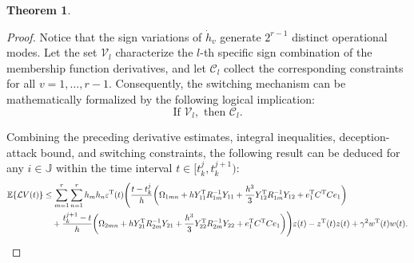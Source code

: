 \documentclass[preprint,review,fleqn,sort&compress,3p]{elsarticle}
\theoremstyle{definition} %
\theoremstyle{definition}%
\newtheorem{thm}{Theorem}[section]
\begin{document}
\begin{thm}
\begin{proof}
			Notice that the sign variations of $\dot{h}_v$ generate $2^{r-1}$ distinct operational modes. Let the set $\mathcal{V}_l$ characterize the $l$-th specific sign combination of the membership function derivatives, and let $\mathcal{C}_l$ collect the corresponding constraints for all $v=1,\ldots,r-1$. Consequently, the switching mechanism can be mathematically formalized by the following logical implication:
			\begin{equation}
				\text{If } \mathcal{V}_l, \text{ then } \mathcal{C}_l. \label{eq_if_then_2}
			\end{equation}
			
			Combining the preceding derivative estimates, integral inequalities, deception-attack bound, and switching constraints, the following result can be deduced for any $i \in \mathbb{J}$ within the time interval $t \in [t_k^j, t_k^{j+1})$:
			\begin{align}
				\mathbb{E}\{\mathcal{L}V(t)\}
				&\leq
				\sum_{m=1}^{r} \sum_{n=1}^{r} h_m h_n \varepsilon^\mathrm{T}(t) \Bigg( 
				\frac{t - t_k^j}{h} \bigg( 
				\Omega_{1mn} 
				+ h  Y_{11}^{\mathrm{T}} R_{1m}^{-1} Y_{11} 
				+ \frac{h^3}{3} Y_{12}^{\mathrm{T}} R_{1m}^{-1} Y_{12}
				+ e_{1}^{\mathrm{T}} C^{\mathrm{T}}C e_1 \bigg) \notag \\
				&\quad + \frac{t_{k}^{j+1} - t}{h} \bigg( 
				\Omega_{2mn} 
				+ h Y_{21}^{\mathrm{T}} R_{2m}^{-1} Y_{21} 
				+ \frac{h^3}{3} Y_{22}^{\mathrm{T}} R_{2m}^{-1} Y_{22}
				+ e_{1}^{\mathrm{T}} C^{\mathrm{T}}C e_1  
				\bigg) \Bigg) \varepsilon(t) 
				- z^{\mathrm{T}}(t)z(t) + \gamma^2 w^{\mathrm{T}}(t)w(t).
			\end{align}

			

\end{proof}
\end{thm}
\end{document}

